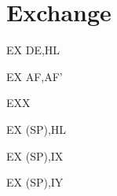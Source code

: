 \documentclass[twoside,openright,a4paper]{book}
\begin{document}
\section{Exchange}

\begin{instrtable}	

	\begin{instruction}{EX DE,HL} 
			\Flags{\FN}{\FN}{\FN}{\FN}{\FN}{\FN}
	\end{instruction}

	\begin{instruction}{EX AF,AF'} 
			\Flags{\FN}{\FN}{\FN}{\FN}{\FN}{\FN}
	\end{instruction}

	\begin{instruction}{EXX} 
			\Flags{\FN}{\FN}{\FN}{\FN}{\FN}{\FN}
		\SkipToSymbol
		\SkipToSymbol
	\end{instruction}

	\begin{instruction}{EX (SP),HL} 
			\Flags{\FN}{\FN}{\FN}{\FN}{\FN}{\FN}
		\SkipToSymbol 
	\end{instruction}

	\begin{instruction}{EX (SP),IX} 
			\Flags{\FN}{\FN}{\FN}{\FN}{\FN}{\FN}
		\SkipToSymbol
			\FromSymbolToOpCode
	\end{instruction}

	\begin{lastinstruction}{EX (SP),IY} 
			\Flags{\FN}{\FN}{\FN}{\FN}{\FN}{\FN}
		\SkipToSymbol
			\FromSymbolToOpCode
	\end{lastinstruction}

\end{instrtable}
\end{document}
